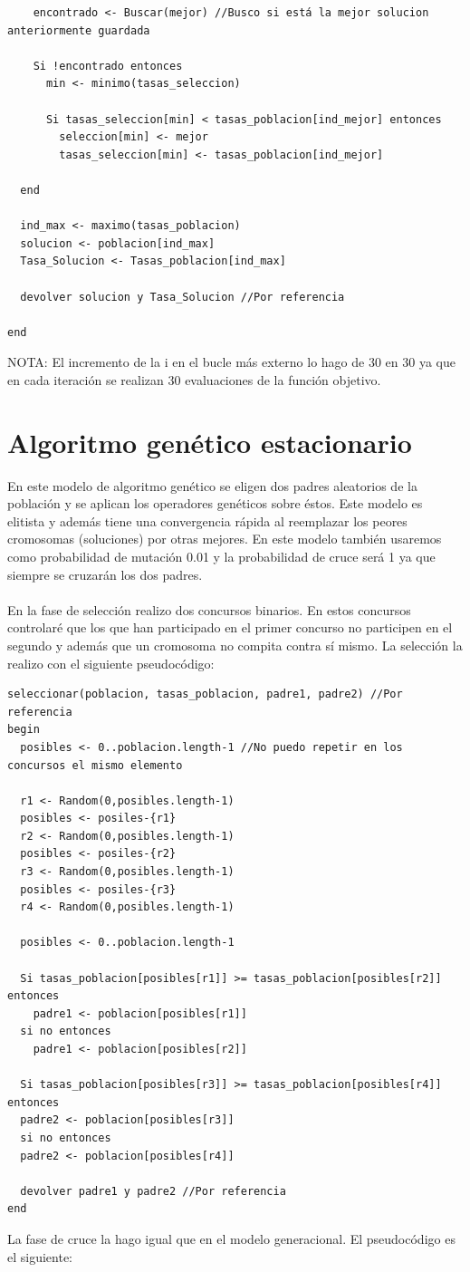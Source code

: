 \begin{lstlisting}
    encontrado <- Buscar(mejor) //Busco si está la mejor solucion anteriormente guardada
    
    Si !encontrado entonces
      min <- minimo(tasas_seleccion)
      
      Si tasas_seleccion[min] < tasas_poblacion[ind_mejor] entonces
        seleccion[min] <- mejor
        tasas_seleccion[min] <- tasas_poblacion[ind_mejor]
        
  end
  
  ind_max <- maximo(tasas_poblacion)
  solucion <- poblacion[ind_max]
  Tasa_Solucion <- Tasas_poblacion[ind_max]
  
  devolver solucion y Tasa_Solucion //Por referencia
  
end
\end{lstlisting}
NOTA: El incremento de la i en el bucle más externo lo hago de 30 en 30 ya que en cada iteración se realizan 30 evaluaciones de la función objetivo.

\section{Algoritmo genético estacionario}
En este modelo de algoritmo genético se eligen dos padres aleatorios de la población y se aplican los operadores genéticos sobre éstos. Este modelo es elitista y además tiene una convergencia rápida al reemplazar los peores cromosomas (soluciones) por otras mejores. En este modelo también usaremos como probabilidad de mutación 0.01 y la probabilidad de cruce será 1 ya que siempre se cruzarán los dos padres.
\\
\\
En la fase de selección realizo dos concursos binarios. En estos concursos controlaré que los que han participado en el primer concurso no participen en el segundo y además que un cromosoma no compita contra sí mismo. La selección la realizo con el siguiente pseudocódigo:
\begin{lstlisting}
seleccionar(poblacion, tasas_poblacion, padre1, padre2) //Por referencia 
begin
  posibles <- 0..poblacion.length-1 //No puedo repetir en los concursos el mismo elemento
  
  r1 <- Random(0,posibles.length-1)
  posibles <- posiles-{r1}
  r2 <- Random(0,posibles.length-1)
  posibles <- posiles-{r2}
  r3 <- Random(0,posibles.length-1)
  posibles <- posiles-{r3}
  r4 <- Random(0,posibles.length-1)

  posibles <- 0..poblacion.length-1
  
  Si tasas_poblacion[posibles[r1]] >= tasas_poblacion[posibles[r2]] entonces
    padre1 <- poblacion[posibles[r1]]
  si no entonces
    padre1 <- poblacion[posibles[r2]]
    
  Si tasas_poblacion[posibles[r3]] >= tasas_poblacion[posibles[r4]] entonces
  padre2 <- poblacion[posibles[r3]]
  si no entonces
  padre2 <- poblacion[posibles[r4]]
  
  devolver padre1 y padre2 //Por referencia
end
\end{lstlisting}
La fase de cruce la hago igual que en el modelo generacional. El pseudocódigo es el siguiente:

